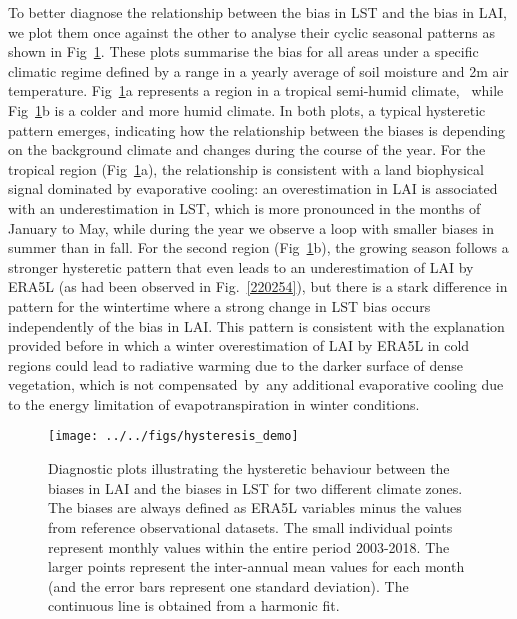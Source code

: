 \documentclass[gmd, manuscript]{copernicus}
\begin{document}
{To better diagnose the relationship between the bias in LST and the bias
in LAI, we plot them once against the other to analyse their cyclic
seasonal patterns as shown in Fig~{\ref{842529}}. These
plots summarise the bias for all areas under a specific climatic regime
defined by a range in a yearly average of soil moisture and 2m air
temperature. Fig~{\ref{842529}}a represents a region in
a tropical semi-humid climate,~ while
Fig~{\ref{842529}}b is a colder and more humid climate.
In both plots, a typical hysteretic pattern emerges, indicating how the
relationship between the biases is depending on the background climate
and changes during the course of the year. For the tropical region
(Fig~{\ref{842529}}a), the relationship is consistent
with a land biophysical signal dominated by evaporative cooling: an
overestimation in LAI is associated with an underestimation in LST,
which is more pronounced in the months of January to May, while during
the year we observe a loop with smaller biases in summer than in fall.
For the second region (Fig~{\ref{842529}}b), the
growing season follows a stronger hysteretic pattern that even leads to
an underestimation of LAI by ERA5L (as had been observed in
Fig.~{\ref{220254}}), but there is a stark difference
in pattern for the wintertime where a strong change in LST bias occurs
independently of the bias in LAI. This pattern is consistent with the
explanation provided before in which a winter overestimation of LAI by
ERA5L in cold regions could lead to radiative warming due to the darker
surface of dense vegetation, which is not compensated~by~any additional
evaporative cooling due to the energy limitation of evapotranspiration
in winter conditions.~

\par\null{}
\begin{figure}[H]
\begin{center}
\texttt{[image: ../../figs/hysteresis\_demo]}
\caption{{Diagnostic plots illustrating the hysteretic behaviour between the
biases in LAI and the biases in LST for two different climate zones. The
biases are always defined as ERA5L variables minus the values from
reference observational datasets. The small individual points represent
monthly values within the entire period 2003-2018. The larger points
represent the inter-annual mean values for each month (and the error
bars represent one standard deviation). The continuous line is obtained
from a harmonic fit.
{\label{842529}}%
}}
\end{center}
\end{figure}


}
\end{document}
